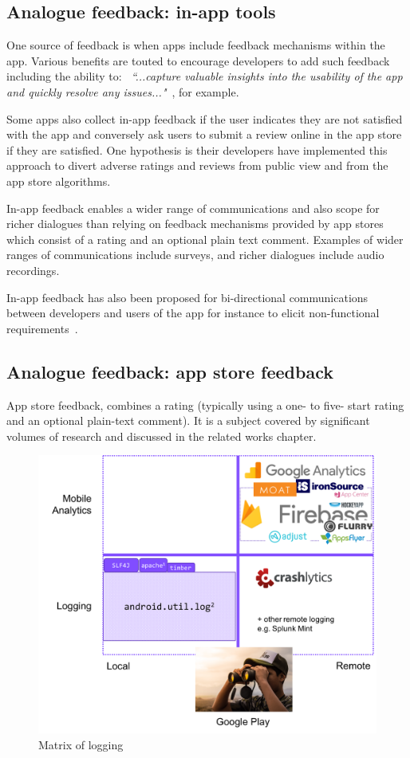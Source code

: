\subsection{Analogue feedback: in-app tools}
One source of feedback is when apps include feedback mechanisms within the app. Various benefits are touted to encourage developers to add such feedback including the ability to: ~\emph{``...capture valuable insights into the usability of the app and quickly resolve any issues..."}~\citep{mopinion2017_top11_mobile_in_app_feedback_tools}, for example. 

Some apps also collect in-app feedback if the user indicates they are not satisfied with the app and conversely ask users to submit a review online in the app store if they are satisfied. One hypothesis is their developers have implemented this approach to divert adverse ratings and reviews from public view and from the app store algorithms. 

In-app feedback enables a wider range of communications and also scope for richer dialogues than relying on feedback mechanisms provided by app stores which consist of a rating and an optional plain text comment. Examples of wider ranges of communications include surveys, and richer dialogues include audio recordings.

In-app feedback has also been proposed for bi-directional communications between developers and users of the app for instance to elicit non-functional requirements~\citep{avellis_harty_yu_towards_mobile_twin_peaks}.

\subsection{Analogue feedback: app store feedback}
App store feedback, combines a rating (typically using a one- to five- start rating and an optional plain-text comment). It is a subject covered by significant volumes of research and discussed in the related works chapter. %

\begin{figure}[!htbp]
    \centering
    \includegraphics[width=12cm]{images/matrix-of-logging.png}
    \caption{Matrix of logging}
    \label{fig:matrix-of-logging}
\end{figure}

